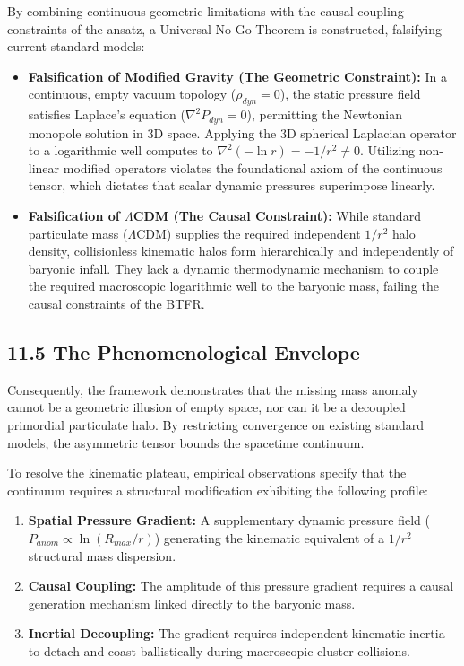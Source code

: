 By combining continuous geometric limitations with the causal coupling constraints of the ansatz, a Universal No-Go Theorem is constructed, falsifying current standard models: 
\begin{itemize} 
    \item \textbf{Falsification of Modified Gravity (The Geometric Constraint):} In a continuous, empty vacuum topology ($\rho_{dyn} = 0$), the static pressure field satisfies Laplace's equation ($\nabla^2 P_{dyn} = 0$), permitting the Newtonian monopole solution in 3D space. Applying the 3D spherical Laplacian operator to a logarithmic well computes to $\nabla^2 (-\ln r) = -1/r^2 \neq 0$. Utilizing non-linear modified operators violates the foundational axiom of the continuous tensor, which dictates that scalar dynamic pressures superimpose linearly. 
    \item \textbf{Falsification of $\Lambda$CDM (The Causal Constraint):} While standard particulate mass ($\Lambda$CDM) supplies the required independent $1/r^2$ halo density, collisionless kinematic halos form hierarchically and independently of baryonic infall. They lack a dynamic thermodynamic mechanism to couple the required macroscopic logarithmic well to the baryonic mass, failing the causal constraints of the BTFR. 
\end{itemize}

\subsection*{11.5 The Phenomenological Envelope} 
Consequently, the framework demonstrates that the missing mass anomaly cannot be a geometric illusion of empty space, nor can it be a decoupled primordial particulate halo. By restricting convergence on existing standard models, the asymmetric tensor bounds the spacetime continuum.

To resolve the kinematic plateau, empirical observations specify that the continuum requires a structural modification exhibiting the following profile: 
\begin{enumerate}
    \item \textbf{Spatial Pressure Gradient:} A supplementary dynamic pressure field ($P_{anom} \propto \ln(R_{max}/r)$) generating the kinematic equivalent of a $1/r^2$ structural mass dispersion. 
    \item \textbf{Causal Coupling:} The amplitude of this pressure gradient requires a causal generation mechanism linked directly to the baryonic mass. 
    \item \textbf{Inertial Decoupling:} The gradient requires independent kinematic inertia to detach and coast ballistically during macroscopic cluster collisions. 
\end{enumerate}

